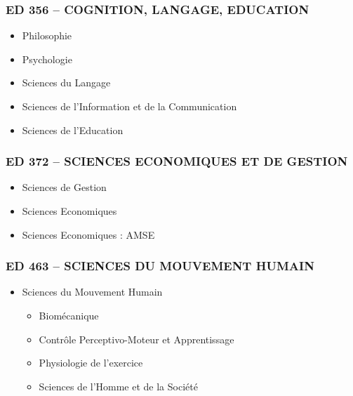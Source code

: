\subsubsection*{ED 356 -- COGNITION, LANGAGE, EDUCATION}\label{ed-356-cognition-langage-education}

\begin{itemize}
\item
  Philosophie
\item
  Psychologie
\item
  Sciences du Langage
\item
  Sciences de l'Information et de la Communication
\item
  Sciences de l'Education
\end{itemize}

\subsubsection*{ED 372 -- SCIENCES ECONOMIQUES ET DE GESTION}\label{ed-372-sciences-economiques-et-de-gestion}

\begin{itemize}
\item
  Sciences de Gestion
\item
  Sciences Economiques
\item
  Sciences Economiques : AMSE
\end{itemize}

\subsubsection*{ED 463 -- SCIENCES DU MOUVEMENT HUMAIN}\label{ed-463-sciences-du-mouvement-humain}

\begin{itemize}
\item
Sciences du Mouvement Humain
\begin{itemize}
\item Biomécanique
\item Contrôle Perceptivo-Moteur et Apprentissage
\item Physiologie de l'exercice
\item Sciences de l'Homme et de la Société
\end{itemize}
\end{itemize}
